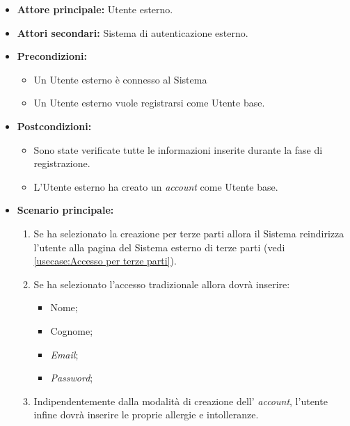 \label{usecase:Registrazione Utente base}
\begin{itemize}

	\item \textbf{Attore principale:} Utente esterno.
	\item \textbf{Attori secondari:} Sistema di autenticazione esterno.

	\item \textbf{Precondizioni:} 
	\begin{itemize}
        \item  Un Utente esterno è connesso al Sistema
        \item  Un Utente esterno vuole registrarsi come Utente base.
    \end{itemize}
    

	\item \textbf{Postcondizioni:} 
    \begin{itemize}
        \item  Sono state verificate tutte le informazioni inserite durante la fase di registrazione.
        \item  L'Utente esterno ha creato un \textit{account} come Utente base.
    \end{itemize}

	\item \textbf{Scenario principale:}
	\begin{enumerate}

            \item Se ha selezionato la creazione per terze parti allora il Sistema reindirizza l'utente alla pagina del Sistema esterno di terze parti (vedi \autoref{usecase:Accesso per terze parti}).
            \item Se ha selezionato l'accesso tradizionale allora dovrà inserire:
            \begin{itemize}
                \item Nome;
                \item Cognome;
                \item \textit{Email};
                \item \textit{Password};
            \end{itemize}
            \item Indipendentemente dalla modalità di creazione dell' \textit{account}, l'utente infine dovrà inserire le proprie allergie e intolleranze.
            
	\end{enumerate}
	
\end{itemize}

